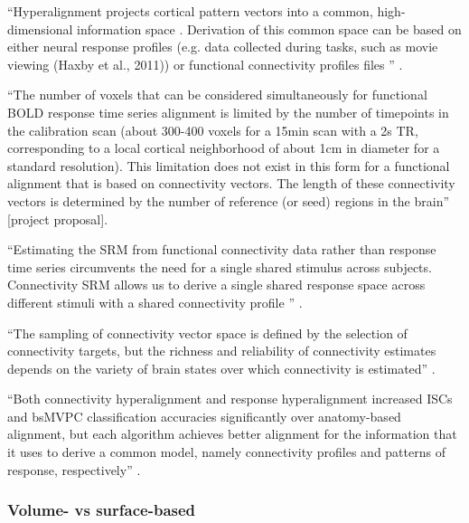``Hyperalignment projects cortical pattern vectors into a common,
high-dimensional information space \citep{haxby2020hyperalignment}.
%
Derivation of this common space can be based on either neural response profiles
(e.g. data collected during tasks, such as movie viewing (Haxby et al., 2011))
or functional connectivity profiles files \citep{guntupalli2018computational}''
\citep{busch2021hybrid}.

``The number of voxels that can be considered simultaneously for functional BOLD
response time series alignment is limited by the number of timepoints in the
calibration scan (about 300-400 voxels for a 15min scan with a 2s TR,
corresponding to a local cortical neighborhood of about 1cm in diameter for a
standard resolution).
%
This limitation does not exist in this form for a functional alignment that is
based on connectivity vectors.
%
The length of these connectivity vectors is determined by the number of
reference (or seed) regions in the brain'' [project proposal].

``Estimating the SRM from functional connectivity data rather than response time
series circumvents the need for a single shared stimulus across subjects.
%
Connectivity SRM allows us to derive a single shared response space across
different stimuli with a shared connectivity profile
\citep{nastase2019leveraging}'' \citep{kumar2020brainiak}.

%
``The sampling of connectivity vector space is defined by the selection of
connectivity targets, but the richness and reliability of connectivity estimates
depends on the variety of brain states over which connectivity is estimated''
\citep{haxby2020hyperalignment}.

%
``Both connectivity hyperalignment and response hyperalignment increased ISCs
and bsMVPC classification accuracies significantly over anatomy-based alignment,
but each algorithm achieves better alignment for the information that it uses to
derive a common model, namely connectivity profiles and patterns of response,
respectively'' \citep{guntupalli2018computational}.


\subsubsection{Volume- vs surface-based}



